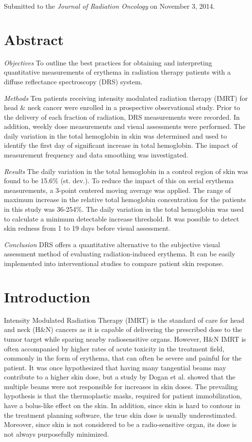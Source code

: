 \noindent Submitted to the \textit{Journal of Radiation Oncology} on November 3, 2014.

\section*{Abstract}
\noindent \emph{Objectives} To outline the best practices for obtaining and interpreting quantitative measurements of erythema in radiation therapy patients with a diffuse reflectance spectroscopy (DRS) system.

\noindent \emph{Methods} Ten patients receiving intensity modulated radiation therapy (IMRT) for head \& neck cancer were enrolled in a prospective observational study. Prior to the delivery of each fraction of radiation, DRS measurements were recorded. In addition, weekly dose measurements and visual assessments were performed. The daily variation in the total hemoglobin in skin was determined and used to identify the first day of significant increase in total hemoglobin. The impact of measurement frequency and data smoothing was investigated.

\noindent \emph{Results} The daily variation in the total hemoglobin in a control region of skin was found to be 15.6\% (st. dev.). To reduce the impact of this on serial erythema measurements, a 3-point centered moving average was applied. The range of maximum increase in the relative total hemoglobin concentration for the patients in this study was 36-254\%. The daily variation in the total hemoglobin was used to calculate a minimum detectable increase threshold. It was possible to detect skin redness from 1 to 19 days before visual assessment.

\noindent \emph{Conclusion} DRS offers a quantitative alternative to the subjective visual assessment method of evaluating radiation-induced erythema. It can be easily implemented into interventional studies to compare patient skin response.

\section{Introduction}
Intensity Modulated Radiation Therapy (IMRT) is the standard of care for head and neck (H\&N) cancers as it is capable of delivering the prescribed dose to the tumor target while sparing nearby radiosensitive organs.\cite{Lee2007} However, H\&N IMRT is often accompanied by higher rates of acute toxicity in the treatment field, commonly in the form of erythema, that can often be severe and painful for the patient.\cite{DeConno1991} It was once hypothesized that having many tangential beams may contribute to a higher skin dose, but a study by Dogan et al. showed that the multiple beams were not responsible for increases in skin doses.\cite{Dogan2003} The prevailing hypothesis is that the thermoplastic masks, required for patient immobilization, have a bolus-like effect on the skin.\cite{Lee2002} In addition, since skin is hard to contour in the treatment planning software, the true skin dose is usually underestimated.\cite{Court2008} Moreover, since skin is not considered to be a radio-sensitive organ, its dose is not always purposefully minimized.\cite{Saibishkumar2008}

